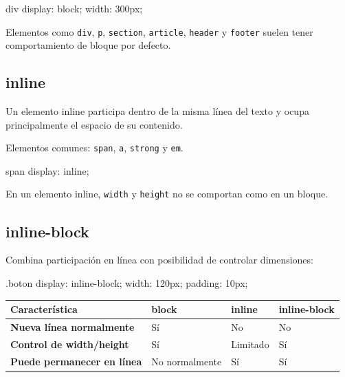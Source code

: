 \documentclass[11pt]{article}
\begin{document}
    \begin{csscodedark}
        div {
            display: block;
            width: 300px;
        }
    \end{csscodedark}

    Elementos como \texttt{div}, \texttt{p}, \texttt{section}, \texttt{article}, \texttt{header} y \texttt{footer} suelen tener comportamiento de bloque por defecto.

    \subsection{inline}

    Un elemento inline participa dentro de la misma línea del texto y ocupa principalmente el espacio de su contenido.

    Elementos comunes: \texttt{span}, \texttt{a}, \texttt{strong} y \texttt{em}.

    \begin{csscodedark}
        span {
            display: inline;
        }
    \end{csscodedark}

    En un elemento inline, \texttt{width} y \texttt{height} no se comportan como en un bloque.

    \subsection{inline-block}

    Combina participación en línea con posibilidad de controlar dimensiones:

    \begin{csscodedark}
        .boton {
            display: inline-block;
            width: 120px;
            padding: 10px;
        }
    \end{csscodedark}

    \begin{center}
        \begin{tabularx}{0.92\textwidth}{>{\bfseries}p{6cm}p{4cm} X X}
            \toprule
            Característica & block & inline & inline-block \\
            \midrule
            Nueva línea normalmente & Sí & No & No \\
            Control de width/height & Sí & Limitado & Sí \\
            Puede permanecer en línea & No normalmente & Sí & Sí \\
            \bottomrule
        \end{tabularx}
    \end{center}
\end{document}
